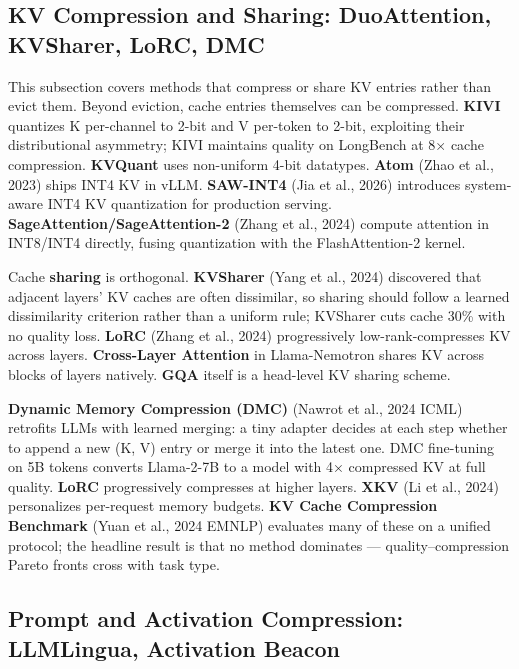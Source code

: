 \subsection{KV Compression and Sharing: DuoAttention, KVSharer, LoRC, DMC}\label{kv-compression-and-sharing-duoattention-kvsharer-lorc-dmc}

This subsection covers methods that compress or share KV entries rather than evict them. Beyond eviction, cache entries themselves can be compressed. \textbf{KIVI} quantizes K per-channel to 2-bit and V per-token to 2-bit, exploiting their distributional asymmetry; KIVI maintains quality on LongBench at 8× cache compression. \textbf{KVQuant} uses non-uniform 4-bit datatypes. \textbf{Atom} (Zhao et al., 2023) ships INT4 KV in vLLM. \textbf{SAW-INT4} (Jia et al., 2026) introduces system-aware INT4 KV quantization for production serving. \textbf{SageAttention/SageAttention-2} (Zhang et al., 2024) compute attention in INT8/INT4 directly, fusing quantization with the FlashAttention-2 kernel.

Cache \textbf{sharing} is orthogonal. \textbf{KVSharer} (Yang et al., 2024) discovered that adjacent layers' KV caches are often dissimilar, so sharing should follow a learned dissimilarity criterion rather than a uniform rule; KVSharer cuts cache 30\% with no quality loss. \textbf{LoRC} (Zhang et al., 2024) progressively low-rank-compresses KV across layers. \textbf{Cross-Layer Attention} in Llama-Nemotron shares KV across blocks of layers natively. \textbf{GQA} itself is a head-level KV sharing scheme.

\textbf{Dynamic Memory Compression (DMC)} (Nawrot et al., 2024 ICML) retrofits LLMs with learned merging: a tiny adapter decides at each step whether to append a new (K, V) entry or merge it into the latest one. DMC fine-tuning on 5B tokens converts Llama-2-7B to a model with 4× compressed KV at full quality. \textbf{LoRC} progressively compresses at higher layers. \textbf{XKV} (Li et al., 2024) personalizes per-request memory budgets. \textbf{KV Cache Compression Benchmark} (Yuan et al., 2024 EMNLP) evaluates many of these on a unified protocol; the headline result is that no method dominates --- quality--compression Pareto fronts cross with task type.

\subsection{Prompt and Activation Compression: LLMLingua, Activation Beacon}\label{prompt-and-activation-compression-llmlingua-activation-beacon}

